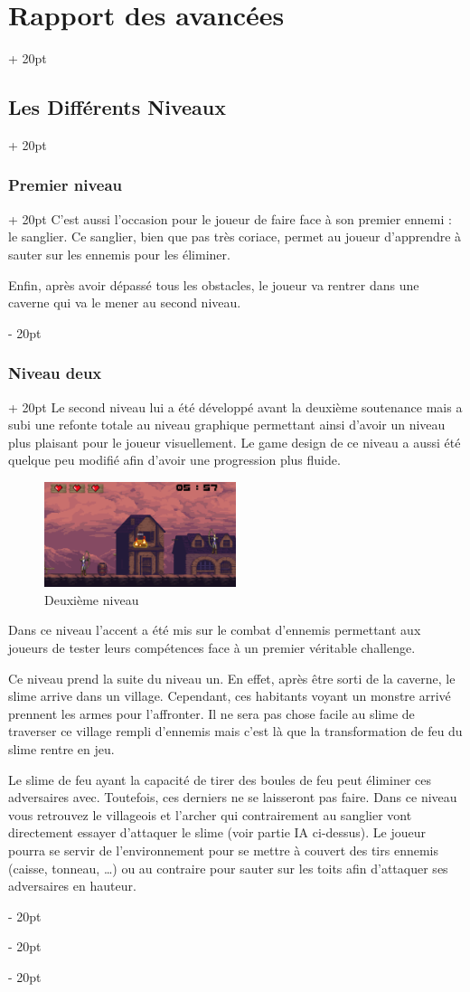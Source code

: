 \documentclass[a4paper, 12pt, twoside]{article}
\newcommand{\ind}[1][20pt]{\advance\leftskip + #1}
\newcommand{\deind}[1][20pt]{\advance\leftskip - #1}
\newenvironment{indt}[2][20pt]{#2 \par \ind[#1]}{\par \deind} %
\begin{document}
\begin{indt}{\section{Rapport des avancées}}
\begin{indt}{\subsection{Les Différents Niveaux}}
\begin{indt}{\subsubsection{Premier niveau}}
                C’est aussi l’occasion pour le joueur de faire face à son premier ennemi : le sanglier. Ce sanglier, bien que pas très coriace, permet au joueur d’apprendre à sauter sur les ennemis pour les éliminer.

                Enfin, après avoir dépassé tous les obstacles, le joueur va rentrer dans une caverne qui va le mener au second niveau.
            \end{indt}

            \begin{indt}{\subsubsection{Niveau deux}}
                Le second niveau lui a été développé avant la deuxième soutenance mais a subi une refonte totale au niveau graphique permettant ainsi d’avoir un niveau plus plaisant pour le joueur visuellement. Le game design de ce niveau a aussi été quelque peu modifié afin d’avoir une progression plus fluide.

                \begin{figure}[h]
                    \centering
                    \includegraphics[width=0.5\textwidth]{niv2_fire.png}
                    \caption{Deuxième niveau}
                    \label{fig:mesh1}
                \end{figure}

                Dans ce niveau l’accent a été mis sur le combat d’ennemis permettant aux joueurs de tester leurs compétences face à un premier véritable challenge.

                Ce niveau prend la suite du niveau un. En effet, après être sorti de la caverne, le slime arrive dans un village. Cependant, ces habitants voyant un monstre arrivé prennent les armes pour l’affronter. Il ne sera pas chose facile au slime de traverser ce village rempli d’ennemis mais c’est là que la transformation de feu du slime rentre en jeu.

                Le slime de feu ayant la capacité de tirer des boules de feu peut éliminer ces adversaires avec. Toutefois, ces derniers ne se laisseront pas faire. Dans ce niveau vous retrouvez le villageois et l’archer qui contrairement au sanglier vont directement essayer d’attaquer le slime (voir partie IA ci-dessus). Le joueur pourra se servir de l’environnement pour se mettre à couvert des tirs ennemis (caisse, tonneau, …) ou au contraire pour sauter sur les toits afin d’attaquer ses adversaires en hauteur.


\end{indt}
\end{indt}
\end{indt}
\end{document}
